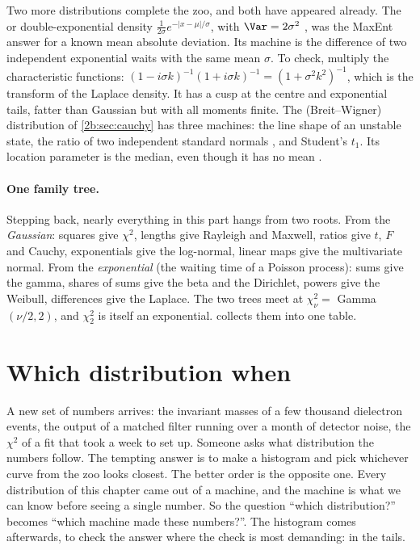 Two more distributions complete the zoo, and both have appeared already. The  or double-exponential density $\frac{1}{2\sigma}e^{-|x-\mu|/\sigma}$, with $\Var=2\sigma^2$ , was the MaxEnt answer for a known mean absolute deviation. Its machine is the difference of two independent exponential waits with the same mean $\sigma$. To check, multiply the characteristic functions: $(1-i\sigma k)^{-1}(1+i\sigma k)^{-1}=(1+\sigma^2k^2)^{-1}$, which is the transform of the Laplace density. It has a cusp at the centre and exponential tails, fatter than Gaussian but with all moments finite. The  (Breit--Wigner) distribution of \cref{2b:sec:cauchy} has three machines: the line shape of an unstable state, the ratio of two independent standard normals , and Student's $t_1$. Its location parameter is the median, even though it has no mean .

\paragraph{One family tree.} Stepping back, nearly everything in this part hangs from two roots. From the \emph{Gaussian}: squares give $\chi^2$, lengths give Rayleigh and Maxwell, ratios give $t$, $F$ and Cauchy, exponentials give the log-normal, linear maps give the multivariate normal. From the \emph{exponential} (the waiting time of a Poisson process): sums give the gamma, shares of sums give the beta and the Dirichlet, powers give the Weibull, differences give the Laplace. The two trees meet at $\chi^2_\nu=$ Gamma$(\nu/2,2)$, and $\chi^2_2$ is itself an exponential.  collects them into one table.
\section{Which distribution when}
\label{2b:sec:which}

A new set of numbers arrives: the invariant masses of a few thousand dielectron events, the output of a matched filter running over a month of detector noise, the $\chi^2$ of a fit that took a week to set up. Someone asks what distribution the numbers follow. The tempting answer is to make a histogram and pick whichever curve from the zoo looks closest. The better order is the opposite one. Every distribution of this chapter came out of a machine, and the machine is what we can know before seeing a single number. So the question ``which distribution?'' becomes ``which machine made these numbers?''. The histogram comes afterwards, to check the answer where the check is most demanding: in the tails.

